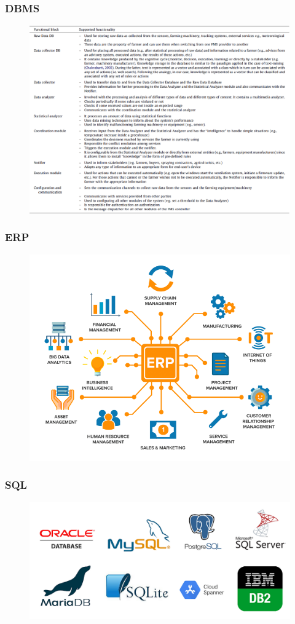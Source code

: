 \documentclass[
	11pt, %
]{beamer}
\begin{document}
\begin{frame}
	\frametitle{DBMS}
	\begin{figure}
		\includegraphics[width=0.8\linewidth]{images/figure10.png}
		\label{fig:Kaloxylos et al. 2012}
	\end{figure}
\end{frame}

\begin{frame}
	\frametitle{ERP}
	\begin{figure}
		\includegraphics[width=0.8\linewidth]{images/figure11.png}
		\label{fig:https://www.finereport.com}
	\end{figure}
\end{frame}

\begin{frame}
	\frametitle{SQL}
	\begin{figure}
		\includegraphics[width=0.8\linewidth]{images/figure12.png}
		\label{fig:https://miny-genie.tistory.com/262}
	\end{figure}
\end{frame}
\end{document}
